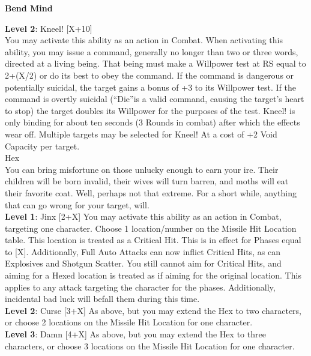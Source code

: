 \documentclass[a4paper, twocolumn, openany]{book}
\newlength{\indentlen}
\newcommand{\tabto}[1]{\setlength{\leftskip}{#1\indentlen}}
\begin{document}
{\tabto{0}
{\bfseries\large Bend Mind\\}

		\tabto{2}
		{\bfseries Level 2}: Kneel! [X+10]\\
		You may activate this ability as an action in Combat. When activating this ability, you
		may issue a command, generally no longer than two or three words, directed at a living being.
		That being must make a Willpower test at RS equal to 2+(X/2) or do its best to obey the
		command. If the command is dangerous or potentially suicidal, the target gains a bonus of +3 to
		its Willpower test. If the command is overtly suicidal (“Die”is a valid command, causing the
		target’s heart to stop) the target doubles its Willpower for the purposes of the test. Kneel! is only
		binding for about ten seconds (3 Rounds in combat) after which the effects wear off. Multiple
		targets may be selected for Kneel! At a cost of +2 Void Capacity per target.\\

\tabto{0}
Hex\\
You can bring misfortune on those unlucky enough to earn your ire. Their children will be born
invalid, their wives will turn barren, and moths will eat their favorite coat. Well, perhaps not that
extreme. For a short while, anything that can go wrong for your target, will.\\

	\tabto{1}
	{\bfseries Level 1}:  Jinx [2+X] You may activate this ability as an action in Combat, targeting one
	character. Choose 1 location/number on the Missile Hit Location table. This location is treated
	as a Critical Hit. This is in effect for Phases equal to [X]. Additionally, Full Auto Attacks can now
	inflict Critical Hits, as can Explosives and Shotgun Scatter. You still cannot aim for Critical Hits,
	and aiming for a Hexed location is treated as if aiming for the original location. This applies to
	any attack targeting the character for the phases. Additionally, incidental bad luck will befall
	them during this time.\\

		\tabto{2}
		{\bfseries Level 2}: Curse [3+X] As above, but you may extend the Hex to two characters,
		or choose 2 locations on the Missile Hit Location for one character.\\

			\tabto{3}
			{\bfseries Level 3}:  Damn [4+X] As above, but you may extend the Hex to three
			characters, or choose 3 locations on the Missile Hit Location for one character.\\

}
\end{document}
